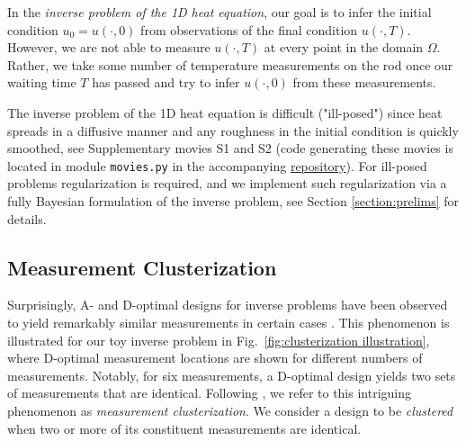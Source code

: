 In the \emph{inverse problem of the 1D heat equation}, our goal is to
infer the initial condition $u_0 = u(\cdot, 0)$ from observations of
the final condition $u(\cdot, T)$. However, we are not able to measure
$u(\cdot, T)$ at every point in the domain $\Omega$. Rather, we take
some number of temperature measurements on the rod once our waiting
time $T$ has passed and try to infer $u(\cdot, 0)$ from these
measurements.

The inverse problem of the 1D heat equation is difficult ("ill-posed")
since heat spreads in a diffusive manner and any roughness in the
initial condition is quickly smoothed, see Supplementary movies S1 and
S2 (code generating these movies is located in module
\texttt{movies.py} in the accompanying
\href{https://github.com/yairdaon/OED}{repository}). For ill-posed
problems regularization is required, and we implement such
regularization via a fully Bayesian formulation of the inverse
problem, see Section \ref{section:prelims} for details.


\subsection{Measurement Clusterization}
Surprisingly, A- and D-optimal designs for inverse problems have been
observed to yield remarkably similar measurements in certain cases
\cite{fedorovDesignSpatialExperiments1996, nyberg2012, fedorov1997,
  Ucinski05, neitzel2019sparse}. This phenomenon is illustrated for
our toy inverse problem in Fig.~\ref{fig:clusterization illustration},
where D-optimal measurement locations are shown for different numbers
of measurements. Notably, for six measurements, a D-optimal design
yields two sets of measurements that are identical. Following
\cite{Ucinski05}, we refer to this intriguing phenomenon as
\emph{measurement clusterization}. We consider a design to be
\emph{clustered} when two or more of its constituent measurements are
identical.


